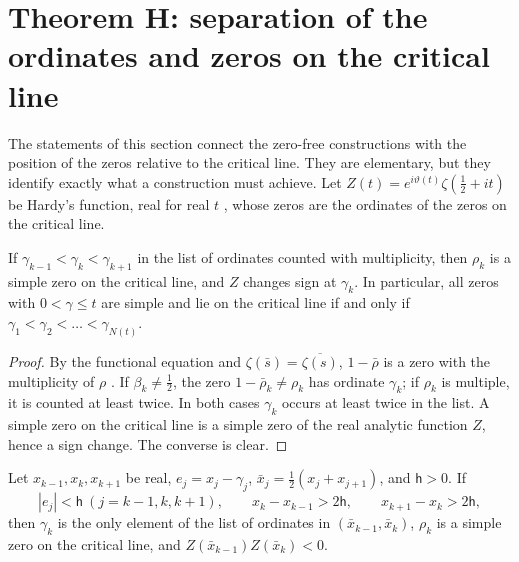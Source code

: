 \section{Theorem H: separation of the ordinates and zeros on the critical line}
\label{sec:separation}

The statements of this section connect the zero-free constructions with the position of the zeros relative to the critical line. They are elementary, but they identify exactly what a construction must achieve. Let $Z(t)=e^{i\vartheta(t)}\zeta(\frac12+it)$ be Hardy's function, real for real $t$ \cite[\S4.17]{Titchmarsh1986}%
, whose zeros are the ordinates of the zeros on the critical line.

\begin{proposition}\label{prop:isolated}
If $\gamma_{k-1}<\gamma_k<\gamma_{k+1}$ in the list of ordinates counted with multiplicity, then $\rho_k$ is a simple zero on the critical line, and $Z$ changes sign at $\gamma_k$. In particular, all zeros with $0<\gamma\le t$ are simple and lie on the critical line if and only if $\gamma_1<\gamma_2<\dots<\gamma_{N(t)}$.
\end{proposition}

\begin{proof}
By the functional equation and $\zeta(\bar s)=\overline{\zeta(s)}$, $1-\bar\rho$ is a zero with the multiplicity of $\rho$ \cite[\S2.1]{Titchmarsh1986}. If $\beta_k\ne\frac12$, the zero $1-\bar\rho_k\ne\rho_k$ has ordinate $\gamma_k$; if $\rho_k$ is multiple, it is counted at least twice. In both cases $\gamma_k$ occurs at least twice in the list. A simple zero on the critical line is a simple zero of the real analytic function $Z$, hence a sign change. The converse is clear.
\end{proof}

\begin{theorem}\label{thm:local_separation}
Let $x_{k-1},x_k,x_{k+1}$ be real, $e_j=x_j-\gamma_j$, $\bar x_j=\frac12(x_j+x_{j+1})$, and $\mathsf h>0$. If
\begin{equation}
|e_j|<\mathsf h\ (j=k-1,k,k+1),\qquad x_k-x_{k-1}>2\mathsf h,\qquad x_{k+1}-x_k>2\mathsf h,
\label{eq:local_separation}
\end{equation}
then $\gamma_k$ is the only element of the list of ordinates in $(\bar x_{k-1},\bar x_k)$, $\rho_k$ is a simple zero on the critical line, and $Z(\bar x_{k-1})Z(\bar x_k)<0$.
\end{theorem}


